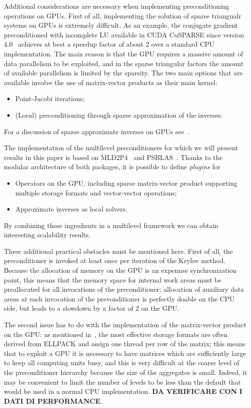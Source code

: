 Additional considerations are necessary when implementing
preconditioning operations on GPUs. First of all, implementing the
solution of sparse triangualr systems on GPUs is extremely difficult.
As an example, the conjugate gradient preconditioned with incomplete
LU available in CUDA CuSPARSE since version 4.0~\cite{Naumov11}
achieves at best a speedup factor of about 2 over a standard CPU
implementation. The main reason is that the GPU requires a massive
amount of data parallelism to be exploited, and in the sparse
triangular factors the amount of available parallelism is limited by
the sparsity. 
The two main  options that  are available  involve the use of
matrix-vector products as their main kernel:
\begin{itemize}
\item Point-Jacobi iterations; 
\item (Local) preconditioning through sparse approximation of the
  inverses.
\end{itemize}
For a discussion of sparse approximate inverses on GPUs 
see~\cite{BERTACCINI2016693}. 


The implementation of the multilevel preconditioners for which we will
present results in this paper is based on MLD2P4~\cite{mld-toms} and
PSBLAS~\cite{psblas3}. Thanks to the modular architecture of both
packages, it is possible to define \emph{plugins} for 
\begin{itemize}
\item Operators on the GPU, including sparse matrix-vector product
  supporting multiple storage formats and vector-vector operations;
\item Approximate inverses as local solvers.
\end{itemize}
By combining these ingredients in a multilevel framework we can obtain
interesting scalability results. 

Three additional practical obstacles must be mentioned here. 
First of all, the preconditioner is invoked at least once per
iteration of the Krylov method.  Because the allocation of memory
on the GPU is an expennse synchronization point, this means that the
memory space for internal work areas must be preallocated for all
invocations  of the preconditioner; allocation of auxiliary data areas at
each invocation of the prevonditioner is perfectly doable on the CPU
side, but leads to a slowdown by a factor of 2 on the GPU. 

The second issue has to do with the implementation of the
matrix-vector product on the GPU: as mentioned
in~\cite{Filippone:2017:SMM:3034774.3017994}, the most effective
storage formats are often derived from ELLPACK  and assign one thread
per row of the matrix; this means that to exploit a GPU it is
necessary to have matrices which are sufficiently large to keep all
computing units busy, and this is very difficult at the coarse level
of the preconditioner hierarchy because the size of the aggregates is
small. Indeed, it may be convenient to limit the number of levels to
be less than the default that would be used in a normal CPU
implementation. 
{\bf DA VERIFICARE CON I DATI DI PERFORMANCE}. 

